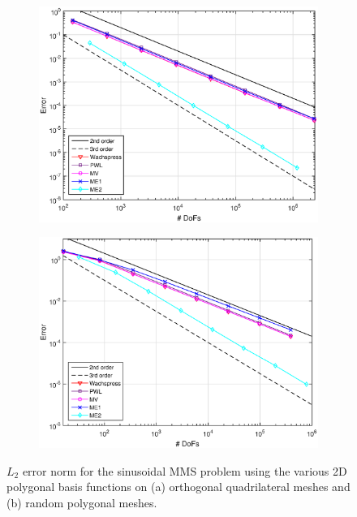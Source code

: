 \documentclass[11pt]{article}
\begin{document}
\begin{figure}[hbt]
\centering
	\begin{subfigure}[b]{0.485\textwidth}
		\centering
		\includegraphics[width=\textwidth]{figures/cart_err_rev1.eps}
		\caption{}
	\end{subfigure}
	\hfill
	\begin{subfigure}[b]{0.49\textwidth}
		\centering
		\includegraphics[width=\textwidth]{figures/poly_err_rev1.eps}
		\caption{}
	\end{subfigure}
\caption{$L_2$ error norm for the sinusoidal MMS problem using the various 2D polygonal basis functions on (a) orthogonal quadrilateral meshes and (b) random polygonal meshes.}
\label{fig::mms_err}
\end{figure}
\end{document}
